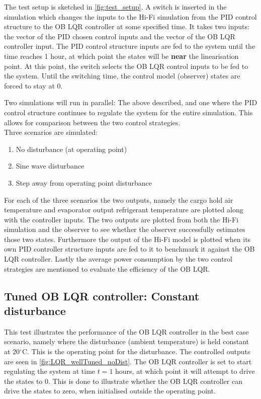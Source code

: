 The test setup is sketched in \cref{fig:test_setup}. A switch is inserted in the simulation which changes the inputs to the Hi-Fi simulation from the PID control structure to the OB LQR controller at some specified time. It takes two inputs: the vector of the PID chosen control inputs and the vector of the OB LQR controller input. The PID control structure inputs are fed to the system until the time reaches 1 hour, at which point the states will be \textbf{near} the linearisation point. At this point, the switch selects the OB LQR control inputs to be fed to the system. Until the switching time, the control model (observer) states are forced to stay at 0.

Two simulations will run in parallel: The above described, and one where the PID control structure continues to regulate the system for the entire simulation. This allows for comparison between the two control strategies.\\

Three scenarios are simulated:

\begin{enumerate}
	\item No disturbance (at operating point)
	\item Sine wave disturbance
	\item Step away from operating point disturbance
\end{enumerate}

\noindent For each of the three scenarios the two outputs, namely the cargo hold air temperature and evaporator output refrigerant temperature are plotted along with the controller inputs. The two outputs are plotted from both the Hi-Fi simulation and the observer to see whether the observer successfully estimates those two states. Furthermore the output of the Hi-Fi model is plotted when its own PID controller structure inputs are fed to it to benchmark it against the OB LQR controller. Lastly the average power consumption by the two control strategies are mentioned to evaluate the efficiency of the OB LQR.

\subsection{Tuned OB LQR controller: Constant disturbance}
This test illustrates the performance of the OB LQR controller in the best case scenario, namely where the disturbance (ambient temperature) is held constant at 20$^{\circ}$C. This is the operating point for the disturbance. The controlled outputs are seen in \cref{fig:LQR_wellTuned_noDist}. The OB LQR controller is set to start regulating the system at time $t=1$ hours, at which point it will attempt to drive the states to 0. This is done to illustrate whether the OB LQR controller can drive the states to zero, when initialised outside the operating point.

